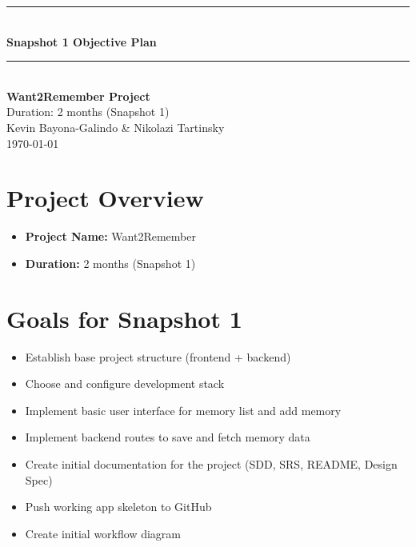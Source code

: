 \documentclass[12pt]{article}
\begin{document}
\begin{titlepage}
    \newcommand{\HRule}{\rule{\linewidth}{0.5mm}} 
    \vspace*{\fill}
    \begin{center}
        \HRule \\[0.5cm]
        {\Huge \bfseries Snapshot 1 Objective Plan \\[0.4cm]}
        \HRule \\[1.5cm]
        {\LARGE \textbf{Want2Remember Project}}\\[0.5cm]
        {\Large Duration: 2 months (Snapshot 1)}\\[2cm]
        {\Large Kevin Bayona-Galindo \& Nikolazi Tartinsky}\\[0.5cm]
        {\large \today}
    \end{center}
    \vspace*{\fill}
\end{titlepage}

\section*{Project Overview}

\begin{itemize}
  \item \textbf{Project Name:} Want2Remember
  \item \textbf{Duration:} 2 months (Snapshot 1)
\end{itemize}

\section*{Goals for Snapshot 1}

\begin{itemize}
  \item Establish base project structure (frontend + backend)
  \item Choose and configure development stack
  \item Implement basic user interface for memory list and add memory
  \item Implement backend routes to save and fetch memory data
  \item Create initial documentation for the project (SDD, SRS, README, Design Spec)
  \item Push working app skeleton to GitHub
  \item Create initial workflow diagram
\end{itemize}
\end{document}

